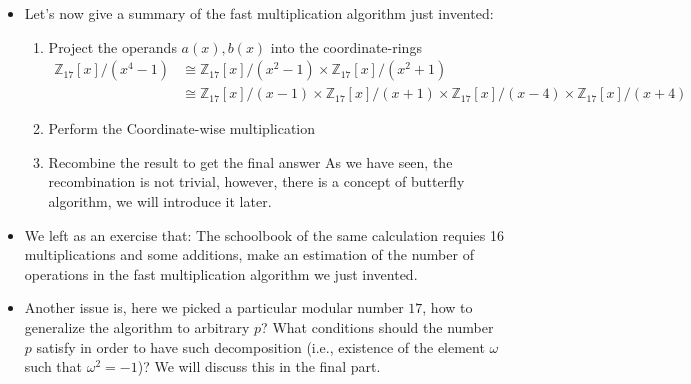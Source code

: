 \begin{frame}
    \begin{itemize}
        \item Let's now give a summary of the fast multiplication algorithm just invented:
            \begin{enumerate}
                \item Project the operands \( a(x), b(x) \) into the coordinate-rings
                    \begin{align*}
                        \mathbb{Z}_{17}[x] / (x^{4} - 1) &\cong
                        \mathbb{Z}_{17}[x] / (x^2-1) \times
                        \mathbb{Z}_{17}[x] / (x^2+1) \\
                        &\cong
                        \mathbb{Z}_{17}[x] / (x-1) \times
                        \mathbb{Z}_{17}[x] / (x+1) \times
                        \mathbb{Z}_{17}[x] / (x-4) \times
                        \mathbb{Z}_{17}[x] / (x+4)
                    \end{align*}
                \item Perform the Coordinate-wise multiplication
                \item Recombine the result to get the final answer
                    As we have seen, the recombination is not trivial, however, 
                    there is a concept of butterfly algorithm, 
                    we will introduce it later.
            \end{enumerate}
        \item We left as an exercise that: 
            The schoolbook of the same calculation requies 16 multiplications and some additions,
            make an estimation of the number of operations in the fast multiplication algorithm we just invented.

        \item Another issue is, here we picked a particular modular number \(17\), 
            how to generalize the algorithm to arbitrary \(p\)?
            What conditions should the number \(p\) satisfy in order to have such decomposition 
            (i.e., existence of the element \(\omega\) such that \(\omega^{2} = -1\))?
            We will discuss this in the final part. 
    \end{itemize}
\end{frame}

